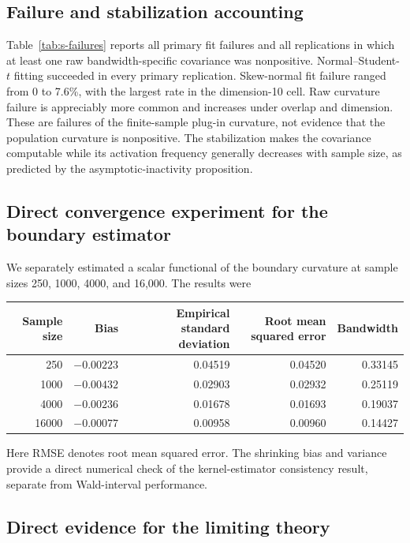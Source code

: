 \subsection{Failure and stabilization accounting}

Table~\ref{tab:s-failures} reports all primary fit failures and all
replications in which at least one raw bandwidth-specific covariance was
nonpositive.  Normal--Student-$t$ fitting succeeded in every primary
replication.  Skew-normal fit failure ranged from 0 to 7.6\%, with the largest
rate in the dimension-10 cell.  Raw curvature failure is appreciably more
common and increases under overlap and dimension.  These are failures of the
finite-sample plug-in curvature, not evidence that the population curvature is
nonpositive.  The stabilization makes the covariance computable while its
activation frequency generally decreases with sample size, as predicted by
the asymptotic-inactivity proposition.

\subsection{Direct convergence experiment for the boundary estimator}

We separately estimated a scalar functional of the boundary curvature at
sample sizes 250, 1000, 4000, and 16,000.  The results were
\begin{center}
\begin{tabular}{rrrrr}
\toprule
Sample size & Bias & Empirical standard deviation & Root mean squared error & Bandwidth\\
\midrule
250   & $-0.00223$ & 0.04519 & 0.04520 & 0.33145\\
1000  & $-0.00432$ & 0.02903 & 0.02932 & 0.25119\\
4000  & $-0.00236$ & 0.01678 & 0.01693 & 0.19037\\
16000 & $-0.00077$ & 0.00958 & 0.00960 & 0.14427\\
\bottomrule
\end{tabular}
\end{center}
Here RMSE denotes root mean squared error. The shrinking bias and variance provide a direct numerical check of the
kernel-estimator consistency result, separate from Wald-interval performance.

\subsection{Direct evidence for the limiting theory}

